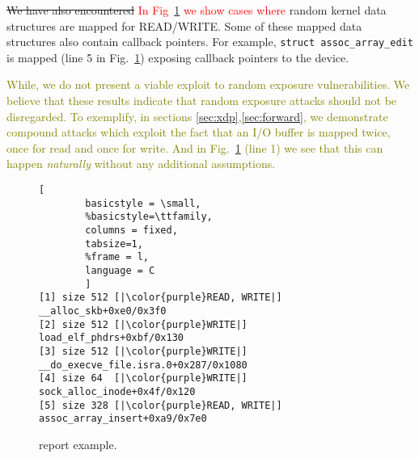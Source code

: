 \sout{We have also encountered} \textcolor{red}{In Fig~\ref{fig:dkasan-report} we show cases where} random kernel data structures are mapped for READ/WRITE. Some of these mapped data structures also contain callback pointers. For example, \texttt{struct assoc\_array\_edit} is mapped (line 5 in Fig.~\ref{fig:dkasan-report}) exposing callback pointers to the device. 

\textcolor{olive}{While, we do not present a viable exploit to random exposure vulnerabilities. We believe that these results indicate that random exposure attacks should not be disregarded. To exemplify, in sections \ref{sec:xdp},\ref{sec:forward}, we demonstrate compound attacks which exploit the fact that an I/O buffer is mapped twice, once for read and once for write. And in Fig.~\ref{fig:dkasan-report} (line 1) we see that this can happen \emph{naturally} without any additional assumptions.}
%
\begin{figure}[t]
\begin{adjustbox}{width=0.9\linewidth}
        \begin{lstlisting}[
        basicstyle = \small,
        %basicstyle=\ttfamily,
        columns = fixed,
        tabsize=1,
        %frame = l,
        language = C
        ]
[1] size 512 [|\color{purple}READ, WRITE|] __alloc_skb+0xe0/0x3f0
[2] size 512 [|\color{purple}WRITE|] load_elf_phdrs+0xbf/0x130
[3] size 512 [|\color{purple}WRITE|] __do_execve_file.isra.0+0x287/0x1080
[4] size 64  [|\color{purple}WRITE|] sock_alloc_inode+0x4f/0x120
[5] size 328 [|\color{purple}READ, WRITE|] assoc_array_insert+0xa9/0x7e0
        \end{lstlisting}
\end{adjustbox}
        \caption{\dkasan report example.}
        \label{fig:dkasan-report}
\end{figure}

